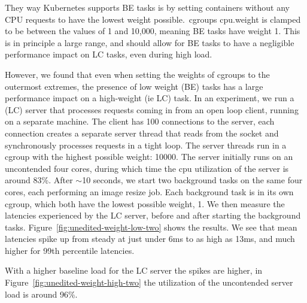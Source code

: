 They way Kubernetes supports BE tasks is by setting containers without any CPU
requests to have the lowest weight possible.\ cgroups cpu.weight is clamped to
be between the values of 1 and 10,000, meaning BE tasks have weight 1. This is
in principle a large range, and should allow for BE tasks to have a negligible
performance impact on LC tasks, even during high load. 

However, we found that even when setting the weights of cgroups to the outermost
extremes, the presence of low weight (BE) tasks has a large performance impact
on a high-weight (ie LC) task. In an experiment, we run a (LC) server that
processes requests coming in from an open loop client, running on a separate
machine. The client has 100  connections to the
server, each connection creates a separate server thread that reads from the
socket and synchronously processes requests in a tight loop. The server threads
run in a cgroup with the highest possible weight: 10000. The server initially
runs on an uncontended four cores, during which time the cpu utilization of the
server is around 83\%. After $\sim$10 seconds, we start two background tasks on
the same four cores, each performing an image resize job. Each background task
is in its own cgroup, which both have the lowest possible weight, 1. We then
measure the latencies experienced by the LC server, before and after starting
the background tasks. Figure~\ref{fig:unedited-weight-low-two} shows the
results. We see that mean latencies spike up from steady at just under 6ms to as
high as 13ms, and much higher for 99th percentile latencies.

With a higher baseline load for the LC server the spikes are higher, in
Figure~\ref{fig:unedited-weight-high-two} the utilization of the uncontended
server load is around 96\%.







